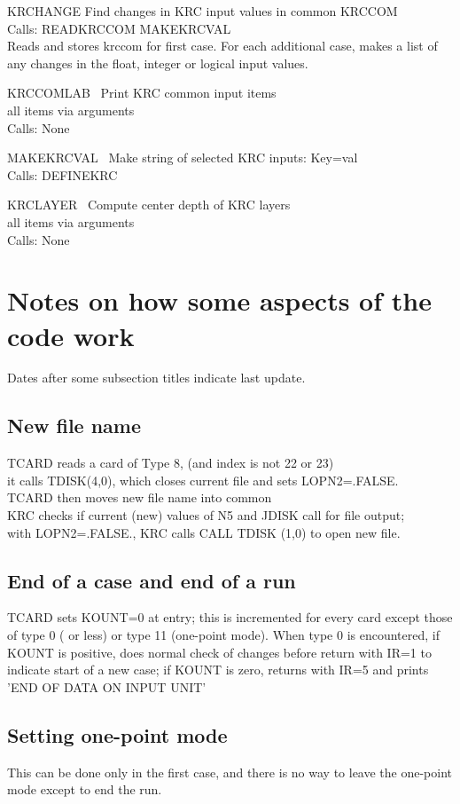 \documentclass{article}
\newcommand{\qi}{\\ \hspace*{2.em}}      %
\newcommand{\qii}{\\ \hspace*{4.em}}     %
\begin{document}
KRCHANGE   Find changes in KRC input values in common KRCCOM \\
Calls:  READKRCCOM  MAKEKRCVAL \\
Reads and stores krccom for first case. For each additional case, makes a 
list of any changes in the float, integer or logical input values. 

KRCCOMLAB \ Print KRC common input items \\
 all items via arguments \\
Calls: None

MAKEKRCVAL \ Make string of selected KRC inputs: Key=val \\
Calls: DEFINEKRC

KRCLAYER \ Compute center depth of KRC layers \\
 all items via arguments \\
Calls: None


\section{Notes on how some aspects of the code work} %
Dates after some subsection titles indicate last update.

\subsection{New file name}%
TCARD reads a card of Type 8, (and index is not 22 or 23)
\qi it calls  TDISK(4,0), which closes current file and sets  LOPN2=.FALSE.
\qii   TCARD then moves new file name into common \\
KRC checks if current (new) values of N5 and JDISK call for file output;
\qi  with  LOPN2=.FALSE., KRC calls CALL TDISK (1,0) to open new file.

\subsection{End of a case and end of a run}%
TCARD sets KOUNT=0 at entry; this is incremented for every card except those of
type 0 ( or less) or type 11 (one-point mode). When type 0 is encountered, if
KOUNT is positive, does normal check of changes before return with IR=1 to
indicate start of a new case; if KOUNT is zero, returns with IR=5 and prints
'END OF DATA ON INPUT UNIT'

\subsection{Setting one-point mode}%
This can be done only in the first case, and there is no way to leave the 
one-point mode except to end the run.
\end{document}
